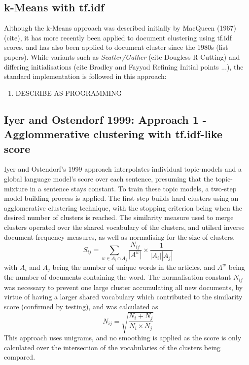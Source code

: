 \documentclass{article}
\begin{document}
\subsection{k-Means with tf.idf}
Although the k-Means approach was described initially by MacQueen (1967)(cite), it has more recently been applied to document clustering using tf.idf scores, and has also been applied to document cluster since the 1980s (list papers). While variants such as \textit{Scatter/Gather} (cite Dougless R Cutting) and differing initialisations (cite Bradley and Fayyad Refining Initial points ...), the standard implementation is followed in this approach:
\begin{enumerate}
	\item DESCRIBE AS PROGRAMMING
\end{enumerate}

\subsection{Iyer and Ostendorf 1999: Approach 1 - Agglommerative clustering with tf.idf-like score} \label{sec:IO1}
Iyer and Ostendorf's 1999 approach interpolates individual topic-models and a global language model's score over each sentence, presuming that the topic-mixture in a sentence stays constant. To train these topic models, a two-step model-building process is applied. The first step builds hard clusters using an agglomerative clustering technique, with the stopping criterion being when the desired number of clusters is reached. The similarity measure used to merge clusters operated over the shared vocabulary of the clusters, and utilsed inverse document frequency measures, as well as normalising for the size of clusters.
\begin{equation}
S_{ij} = \sum_{w \in A_i \cap A_j}  \frac{N_{ij}}{|A^w|} \times \frac{1}{|A_i||A_j|}
\end{equation}
with $A_i$ and $A_j$ being the number of unique words in the articles, and $A^w$ being the number of documents containing the word. The normalisation constant $N_{ij}$ was necessary to prevent one large cluster accumulating all new documents, by virtue of having a larger shared vocabulary which contributed to the similarity score (confirmed by testing), and was calculated as 
\begin{equation}
N_{ij} = \sqrt{\frac{N_i+N_j}{N_i \times N_j}}
\end{equation}
This approach uses unigrams, and no smoothing is applied as the score is only calculated over the intersection of the vocabularies of the clusters being compared.
\end{document}
